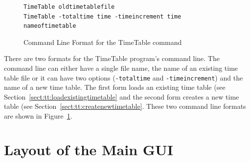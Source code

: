 \begin{figure}[hbpt] 
\begin{centering} 
{\footnotesize
\begin{verbatim} 
TimeTable oldtimetablefile 
TimeTable -totaltime time -timeincrement time nameoftimetable 
\end{verbatim} 
}
\caption{Command Line Format for the TimeTable command} 
\label{fig:tt:cliusage} 
\end{centering} 
\end{figure}
There are two formats for the TimeTable program's command line.  The
command line can either have a single file name, the name of an
existing time table file or it can have two options (\texttt{-totaltime}
and \texttt{-timeincrement}) and the name of a new time table.  The first
form loads an existing time table (see
Section~\ref{sect:tt:loadexistingtimetable} and the second form creates
a new time table (see Section~\ref{sect:tt:createnewtimetable}.  These
two command line formats are shown in Figure~\ref{fig:tt:cliusage}. 

\section{Layout of the Main GUI}

